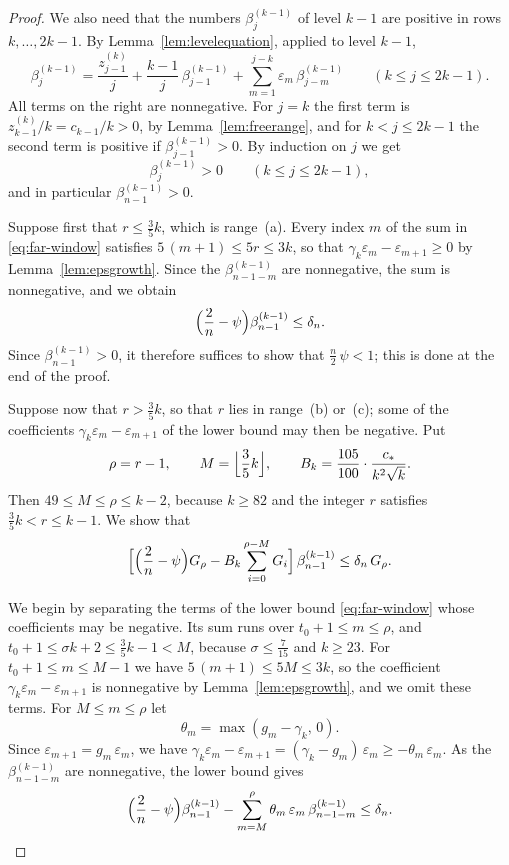 \documentclass{amsart}
\theoremstyle{definition}
\theoremstyle{remark}
\numberwithin{equation}{section}
\begin{document}
\begin{proof}
We also need that the numbers $\beta^{(k-1)}_j$ of level $k-1$ are positive in rows $k,\dots,2k-1$. By Lemma~\ref{lem:levelequation}, applied to level $k-1$,
\begin{equation}\label{eq:far-level}
\beta^{(k-1)}_j=\frac{z^{(k)}_{j-1}}{j}+\frac{k-1}{j}\,\beta^{(k-1)}_{j-1}+\sum_{m=1}^{j-k}\varepsilon_m\,\beta^{(k-1)}_{j-m}\qquad(k\le j\le 2k-1).
\end{equation}
All terms on the right are nonnegative. For $j=k$ the first term is $z^{(k)}_{k-1}/k=c_{k-1}/k>0$, by Lemma~\ref{lem:freerange}, and for $k<j\le 2k-1$ the second term is positive if $\beta^{(k-1)}_{j-1}>0$. By induction on $j$ we get
\[
\beta^{(k-1)}_j>0\qquad(k\le j\le 2k-1),
\]
and in particular $\beta^{(k-1)}_{n-1}>0$.

Suppose first that $r\le\frac35k$, which is range~(a). Every index $m$ of the sum in \eqref{eq:far-window} satisfies $5\,(m+1)\le 5r\le 3k$, so that $\gamma_k\varepsilon_m-\varepsilon_{m+1}\ge 0$ by Lemma~\ref{lem:epsgrowth}. Since the $\beta^{(k-1)}_{n-1-m}$ are nonnegative, the sum is nonnegative, and we obtain
\[
\Bigl(\frac2n-\psi\Bigr)\beta^{(k-1)}_{n-1}\le\delta_n .
\]
Since $\beta^{(k-1)}_{n-1}>0$, it therefore suffices to show that $\frac n2\,\psi<1$; this is done at the end of the proof.

Suppose now that $r>\frac35k$, so that $r$ lies in range~(b) or~(c); some of the coefficients $\gamma_k\varepsilon_m-\varepsilon_{m+1}$ of the lower bound may then be negative. Put
\[
\rho=r-1,\qquad M=\Bigl\lfloor\frac35k\Bigr\rfloor,\qquad B_k=\frac{105}{100}\cdot\frac{c_\ast}{k^2\sqrt k}.
\]
Then $49\le M\le\rho\le k-2$, because $k\ge 82$ and the integer $r$ satisfies $\frac35k<r\le k-1$. We show that
\begin{equation}\label{eq:far-structural}
\Bigl[\Bigl(\frac2n-\psi\Bigr)G_\rho-B_k\sum_{i=0}^{\rho-M}G_i\Bigr]\,\beta^{(k-1)}_{n-1}\le\delta_n\,G_\rho .
\end{equation}

We begin by separating the terms of the lower bound \eqref{eq:far-window} whose coefficients may be negative. Its sum runs over $t_0+1\le m\le\rho$, and $t_0+1\le\sigma k+2\le\frac35k-1<M$, because $\sigma\le\frac{7}{15}$ and $k\ge 23$. For $t_0+1\le m\le M-1$ we have $5\,(m+1)\le 5M\le 3k$, so the coefficient $\gamma_k\varepsilon_m-\varepsilon_{m+1}$ is nonnegative by Lemma~\ref{lem:epsgrowth}, and we omit these terms. For $M\le m\le\rho$ let
\[
\theta_m=\max(g_m-\gamma_k,\,0).
\]
Since $\varepsilon_{m+1}=g_m\,\varepsilon_m$, we have $\gamma_k\varepsilon_m-\varepsilon_{m+1}=(\gamma_k-g_m)\,\varepsilon_m\ge-\theta_m\,\varepsilon_m$. As the $\beta^{(k-1)}_{n-1-m}$ are nonnegative, the lower bound gives
\begin{equation}\label{eq:far-split}
\Bigl(\frac2n-\psi\Bigr)\beta^{(k-1)}_{n-1}-\sum_{m=M}^{\rho}\theta_m\,\varepsilon_m\,\beta^{(k-1)}_{n-1-m}\le\delta_n .
\end{equation}


\end{proof}
\end{document}
